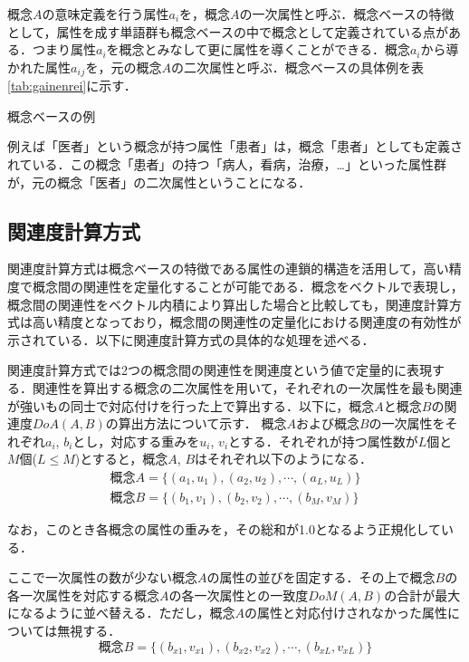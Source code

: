 \documentclass[japanese]{jnlp_1.4}
\begin{document}
概念$A$の意味定義を行う属性$a_i$を，概念$A$の一次属性と呼ぶ．概念ベースの特徴として，属性を成す単語群も概念ベースの中で概念として定義されている点がある．つまり属性$a_i$を概念とみなして更に属性を導くことができる．概念$a_i$から導かれた属性$a_i{}_j$を，元の概念$A$の二次属性と呼ぶ．概念ベースの具体例を表\ref{tab:gainenrei}に示す．

\begin{table}[t]
\caption{概念ベースの例}
\label{tab:gainenrei}

\end{table}

例えば「医者」という概念が持つ属性「患者」は，概念「患者」としても定義されている．この概念「患者」の持つ「病人，看病，治療，…」といった属性群が，元の概念「医者」の二次属性ということになる．



\subsection{関連度計算方式}
\label{DOA}

関連度計算方式は概念ベースの特徴である属性の連鎖的構造を活用して，高い精度で概念間の関連性を定量化することが可能である．概念をベクトルで表現し，概念間の関連性をベクトル内積により算出した場合と比較しても，関連度計算方式は高い精度となっており，概念間の関連性の定量化における関連度の有効性が示されている\cite{Article_05}．以下に関連度計算方式の具体的な処理を述べる．

関連度計算方式では2つの概念間の関連性を関連度という値で定量的に表現する．関連性を算出する概念の二次属性を用いて，それぞれの一次属性を最も関連が強いもの同士で対応付けを行った上で算出する．以下に，概念$A$と概念$B$の関連度$DoA(A,B)$の算出方法について示す．
概念$A$および概念$B$の一次属性をそれぞれ$a_i$, $b_i$とし，対応する重みを$u_i$, $v_i$とする．それぞれが持つ属性数が$L$個と$M$個($L\leq M$)とすると，概念$A$, $B$はそれぞれ以下のようになる．
\begin{gather*}
 \text{概念} A=\{(a_1, u_1), (a_2, u_2), \cdots , (a_L, u_L)\} \\
 \text{概念} B=\{(b_1, v_1), (b_2, v_2), \cdots , (b_M, v_M)\}
\end{gather*}

なお，このとき各概念の属性の重みを，その総和が1.0となるよう正規化している．

ここで一次属性の数が少ない概念$A$の属性の並びを固定する．その上で概念$B$の各一次属性を対応する概念$A$の各一次属性との一致度$DoM(A,B)$の合計が最大になるように並べ替える．ただし，概念$A$の属性と対応付けされなかった属性については無視する．
\[
 \text{概念} B=\{(b_{x1}, v_{x1}), (b_{x2}, v_{x2}), \cdots ,(b_{xL}, v_{xL})\}
\]
\end{document}
